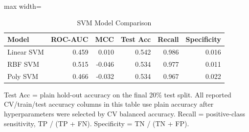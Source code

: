 \begin{table}[htbp]
\centering
\caption{SVM Model Comparison}
\label{tab:svm_comparison}
\begin{adjustbox}{max width=\linewidth}
\begin{tabular}{lrrrrr}
\toprule
Model & ROC-AUC & MCC & Test Acc & Recall & Specificity \\
\midrule
Linear SVM & 0.459 & 0.010 & 0.542 & 0.986 & 0.016 \\
RBF SVM & 0.515 & -0.046 & 0.534 & 0.977 & 0.011 \\
Poly SVM & 0.466 & -0.032 & 0.534 & 0.967 & 0.022 \\
\bottomrule
\end{tabular}
\end{adjustbox}
\par\smallskip
\footnotesize Test Acc = plain hold-out accuracy on the final 20\% test split. All reported CV/train/test accuracy columns in this table use plain accuracy after hyperparameters were selected by CV balanced accuracy. Recall = positive-class sensitivity, TP / (TP + FN). Specificity = TN / (TN + FP).
\end{table}
